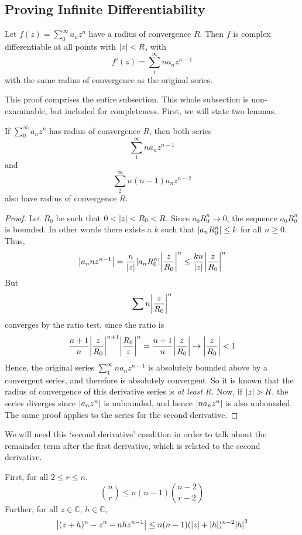 \subsection{Proving Infinite Differentiability}
\begin{theorem}
	Let \(f(z) = \sum_0^\infty a_n z^n\) have a radius of convergence \(R\).
	Then \(f\) is complex differentiable at all points with \(\abs{z} < R\), with
	\[
		f'(z) = \sum_1^\infty n a_n z^{n-1}
	\]
	with the same radius of convergence as the original series.
\end{theorem}
\noindent This proof comprises the entire subsection.
This whole subsection is non-examinable, but included for completeness.
First, we will state two lemmas.
\begin{lemma}
	If \(\sum_0^\infty a_n z^n\) has radius of convergence \(R\), then both series
	\[
		\sum_1^\infty n a_n z^{n-1}
	\]
	and
	\[
		\sum_2^\infty n(n-1)a_n z^{n-2}
	\]
	also have radius of convergence \(R\).
\end{lemma}
\begin{proof}
	Let \(R_0\) be such that \(0 < \abs{z} < R_0 < R\).
	Since \(a_0 R_0^n \to 0\), the sequence \(a_0 R_0^n\) is bounded.
	In other words there exists a \(k\) such that \(\abs{a_n R_0^n} \leq k\) for all \(n \geq 0\).
	Thus,
	\[
		\abs{a_n n z^{n-1}} = \frac{n}{\abs{z}}\abs{a_n R_0^n} \abs{\frac{z}{R_0}}^n \leq \frac{kn}{\abs{z}}\abs{\frac{z}{R_0}}^n
	\]
	But
	\[
		\sum n\abs{\frac{z}{R_0}}^n
	\]
	converges by the ratio test, since the ratio is
	\[
		\frac{n+1}{n}\abs{\frac{z}{R_0}}^{n+1} \abs{\frac{R_0}{z}}^n = \frac{n+1}{n}\abs{\frac{z}{R_0}} \to \abs{\frac{z}{R_0}} < 1
	\]
	Hence, the original series \(\sum_1^\infty n a_n z^{n-1}\) is absolutely bounded above by a convergent series, and therefore is absolutely convergent.
	So it is known that the radius of convergence of this derivative series is \textit{at least} \(R\).
	Now, if \(\abs{z} > R\), the series diverges since \(\abs{a_n z^n}\) is unbounded, and hence \(\abs{n a_n z^n}\) is also unbounded.
	The same proof applies to the series for the second derivative.
\end{proof}
\noindent We will need this `second derivative' condition in order to talk about the remainder term after the first derivative, which is related to the second derivative.
\begin{lemma}
	First, for all \(2 \leq r \leq n\).
	\[
		\binom{n}{r} \leq n(n-1)\binom{n-2}{r-2}
	\]
	Further, for all \(z \in \mathbb C\), \(h \in \mathbb C\),
	\[
		\abs{(z + h)^n - z^n - nhz^{n-1}} \leq n(n-1)(\abs{z} + \abs{h})^{n-2}\abs{h}^2
	\]
\end{lemma}
